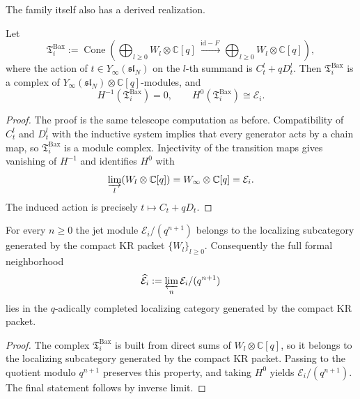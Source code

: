 The family itself also has a derived realization.

\begin{theorem}
\ClaimStatusProvedHere
\label{thm:derived-realization-baxter-rees-family}
Let
\begin{equation}
\mathfrak T_i^{\mathrm{Bax}}
:=
\operatorname{Cone}\!\left(
\bigoplus_{l\ge 0}W_l\otimes \mathbb C[q]
\xrightarrow{\ \mathrm{id}-F\ }
\bigoplus_{l\ge 0}W_l\otimes \mathbb C[q]
\right),
\end{equation}
where the action of $t\in Y_\infty(\mathfrak{sl}_N)$ on the $l$-th summand
is $C_t^l+qD_t^l$. Then
$\mathfrak T_i^{\mathrm{Bax}}$ is a complex of
$Y_\infty(\mathfrak{sl}_N)\otimes\mathbb C[q]$-modules, and
\begin{equation}
H^{-1}(\mathfrak T_i^{\mathrm{Bax}})=0,
\qquad
H^0(\mathfrak T_i^{\mathrm{Bax}})\cong \mathcal E_i.
\end{equation}
\end{theorem}

\begin{proof}
The proof is the same telescope computation as before. Compatibility of
$C_t^l$ and $D_t^l$ with the inductive system implies that every generator
acts by a chain map, so $\mathfrak T_i^{\mathrm{Bax}}$ is a module complex.
Injectivity of the transition maps gives vanishing of $H^{-1}$ and
identifies $H^0$ with
\begin{equation}
\varinjlim_l (W_l\otimes \mathbb C[q])=W_\infty\otimes \mathbb C[q]=\mathcal E_i.
\end{equation}
The induced action is precisely $t\mapsto C_t+qD_t$.
\end{proof}

\begin{corollary}
\ClaimStatusProvedHere
\label{cor:formal-neighborhood-generated-by-KR}
For every $n\ge 0$ the jet module $\mathcal E_i/(q^{n+1})$ belongs to the
localizing subcategory generated by the compact KR packet
$\{W_l\}_{l\ge 0}$. Consequently the full formal neighborhood
\begin{equation}
\widehat{\mathcal E}_i:=\varprojlim_n \mathcal E_i/(q^{n+1})
\end{equation}
lies in the $q$-adically completed localizing category generated by the
compact KR packet.
\end{corollary}

\begin{proof}
The complex $\mathfrak T_i^{\mathrm{Bax}}$ is built from direct sums of
$W_l\otimes\mathbb C[q]$, so it belongs to the localizing subcategory
generated by the compact KR packet. Passing to the quotient modulo
$q^{n+1}$ preserves this property, and taking $H^0$ yields
$\mathcal E_i/(q^{n+1})$. The final statement follows by inverse limit.
\end{proof}

